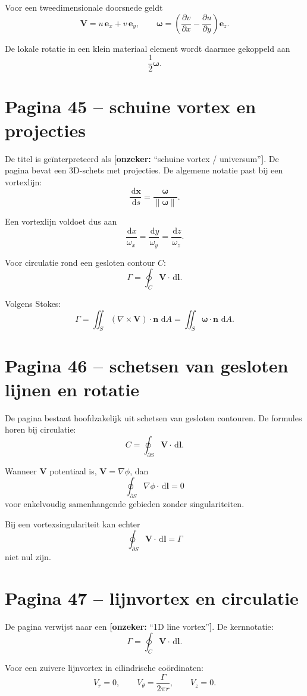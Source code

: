 \documentclass[11pt,a4paper]{article}
\newcommand{\onzeker}[1]{\ifmmode\text{\color{red!70!black}\bfseries[onzeker]}\else\textcolor{red!70!black}{\textbf{[onzeker:} #1\textbf{]}}\fi}
\newcommand{\dd}{\,\mathrm{d}}
\newcommand{\grad}{\nabla}
\newcommand{\curl}{\nabla\times}
\newcommand{\V}{\mathbf{V}}
\newcommand{\xvec}{\mathbf{x}}
\newcommand{\omegav}{\bm{\omega}}
\begin{document}
Voor een tweedimensionale doorsnede geldt
$$
\V =
u\,\mathbf{e}_x + v\,\mathbf{e}_y,
\qquad
\omegav =
\left(
\frac{\partial v}{\partial x}
-
\frac{\partial u}{\partial y}
\right)\mathbf{e}_z.
$$

De lokale rotatie in een klein materiaal element wordt daarmee gekoppeld aan
$$
\frac{1}{2}\omegav.
$$

\section*{Pagina 45 -- schuine vortex en projecties}

De titel is geïnterpreteerd als \onzeker{``schuine vortex / universum''}. De pagina bevat een 3D-schets met projecties. De algemene notatie past bij een vortexlijn:
$$
\frac{\dd \xvec}{\dd s}
=
\frac{\omegav}{\lVert \omegav\rVert}.
$$

Een vortexlijn voldoet dus aan
$$
\frac{\dd x}{\omega_x}
=
\frac{\dd y}{\omega_y}
=
\frac{\dd z}{\omega_z}.
$$

Voor circulatie rond een gesloten contour $C$:
$$
\Gamma
=
\oint_C \V\cdot \dd\mathbf{l}.
$$

Volgens Stokes:
$$
\Gamma
=
\iint_S
\left(\curl \V\right)\cdot \mathbf{n}\,\dd A
=
\iint_S
\omegav\cdot\mathbf{n}\,\dd A.
$$

\section*{Pagina 46 -- schetsen van gesloten lijnen en rotatie}

De pagina bestaat hoofdzakelijk uit schetsen van gesloten contouren. De formules horen bij circulatie:
$$
C = \oint_{\partial S} \V \cdot \dd\mathbf{l}.
$$

Wanneer $\V$ potentiaal is, $\V=\grad\phi$, dan
$$
\oint_{\partial S}\grad\phi\cdot \dd\mathbf{l}=0
$$
voor enkelvoudig samenhangende gebieden zonder singulariteiten.

Bij een vortexsingulariteit kan echter
$$
\oint_{\partial S}\V\cdot\dd\mathbf{l}=\Gamma
$$
niet nul zijn.

\section*{Pagina 47 -- lijnvortex en circulatie}

De pagina verwijst naar een \onzeker{``1D line vortex''}. De kernnotatie:
$$
\Gamma
=
\oint_C \V\cdot \dd\mathbf{l}.
$$

Voor een zuivere lijnvortex in cilindrische coördinaten:
$$
V_r = 0,
\qquad
V_\theta = \frac{\Gamma}{2\pi r},
\qquad
V_z = 0.
$$
\end{document}
